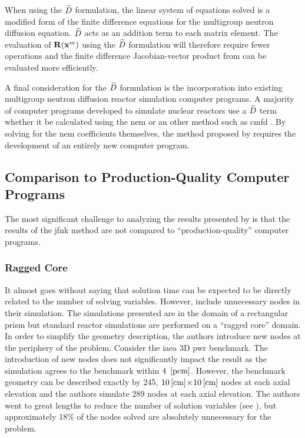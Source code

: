     When using the $\widetilde{D}$ formulation, the linear system of equations solved
    is a modified form of the finite difference equations for the multigroup
    neutron diffusion equation. $\widetilde{D}$ acts as an addition term to each
    matrix element. The evaluation of $\mathbf{R}(\mathbf{x}^m)$ using the $\widetilde{D}$
    formulation will therefore require fewer operations and the finite
    difference Jacobian-vector product from  can be evaluated
    more efficiently.
    
    A final consideration for the $\widetilde{D}$ formulation is the incorporation
    into existing multigroup neutron diffusion reactor simulation computer
    programs. A majority of computer programs developed to simulate nuclear
    reactors use a $\widetilde{D}$ term whether it be calculated using the \gls{nem}
    or an other method such as \gls{cmfd} \cite{casmo4,simulate3,mpact}. By
    solving for the \gls{nem} coefficients themselves, the method proposed by
    \citeauthor{qe2paper} requires the development of an entirely new computer
    program.

  \subsection{Comparison to Production-Quality Computer Programs}

    The most significant challenge to analyzing the results presented by
    \citeauthor{qe2paper} is that the results of the \gls{jfnk} method are not
    compared to ``production-quality'' computer programs. 
    
    \subsubsection{Ragged Core}

      It almost goes without saying that solution time can be expected to be
      directly related to the number of solving variables. However,
      \citeauthor{qe2paper} include unnecessary nodes in their simulation. The
      simulations presented are in the domain of a rectangular prism but
      standard reactor simulations are performed on a ``ragged core'' domain. In
      order to simplify the geometry description, the authors introduce new
      nodes at the periphery of the problem. Consider the \gls{iaea} 3D
      \gls{pwr} benchmark. The introduction of new nodes does not significantly
      impact the result as the simulation agrees to the benchmark within
      $4~\left[\text{{pcm}}\right]$. However, the benchmark geometry can be described exactly
      by 245, $10\left[\text{{cm}}\right] \! \times \! 10\left[\text{{cm}}\right]$ nodes at each axial
      elevation and the authors simulate 289 nodes at each axial elevation. The
      authors went to great lengths to reduce the number of solution variables
      (see ), but approximately 18\% of the nodes
      solved are absolutely unnecessary for the problem.

